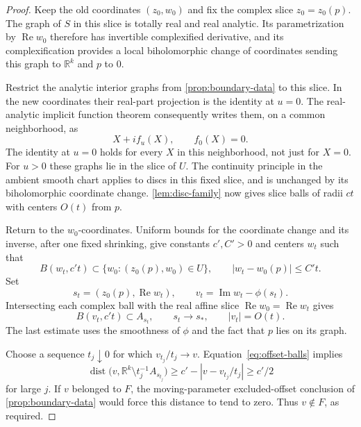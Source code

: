 \begin{proof}
Keep the old coordinates $(z_0,w_0)$ and fix the complex slice $z_0=z_0(p)$.  The graph of $S$ in this slice is totally real and real analytic.  Its parametrization by $\operatorname{Re}w_0$ therefore has invertible complexified derivative, and its complexification provides a local biholomorphic change of coordinates sending this graph to $\mathbb{R}^k$ and $p$ to $0$.

Restrict the analytic interior graphs from \cref{prop:boundary-data} to this slice.  In the new coordinates their real-part projection is the identity at $u=0$. The real-analytic implicit function theorem consequently writes them, on a common neighborhood, as
\[
 X+i f_u(X),\qquad f_0(X)=0.
\]
The identity at $u=0$ holds for every $X$ in this neighborhood, not just for $X=0$.  For $u>0$ these graphs lie in the slice of $U$. The continuity principle in the ambient smooth chart applies to discs in this fixed slice, and is unchanged by its biholomorphic coordinate change.  \cref{lem:disc-family} now gives slice balls of radii $ct$ with centers $O(t)$ from $p$.

Return to the $w_0$-coordinates.  Uniform bounds for the coordinate change and its inverse, after one fixed shrinking, give constants $c',C'>0$ and centers $w_t$ such that
\[
 B(w_t,c't)\subset\{w_0:(z_0(p),w_0)\in U\},
 \qquad |w_t-w_0(p)|\le C't.
\]
Set
\[
 s_t=(z_0(p),\operatorname{Re}w_t),
 \qquad v_t=\operatorname{Im}w_t-\phi(s_t).
\]
Intersecting each complex ball with the real affine slice $\operatorname{Re}w_0=\operatorname{Re}w_t$ gives
\begin{equation}\label{eq:offset-balls}
 B(v_t,c't)\subset A_{s_t},
 \qquad s_t\longrightarrow s_*,
 \qquad |v_t|=O(t).
\end{equation}
The last estimate uses the smoothness of $\phi$ and the fact that $p$ lies on its graph.

Choose a sequence $t_j\downarrow0$ for which $v_{t_j}/t_j\to v$. Equation~\eqref{eq:offset-balls} implies
\[
 \operatorname{dist}\bigl(v,\mathbb{R}^k\setminus t_j^{-1}A_{s_{t_j}}\bigr)
 \ge c'-|v-v_{t_j}/t_j|\ge c'/2
\]
for large $j$.  If $v$ belonged to $F$, the moving-parameter excluded-offset conclusion of \cref{prop:boundary-data} would force this distance to tend to zero.  Thus $v\notin F$, as required.
\end{proof}
